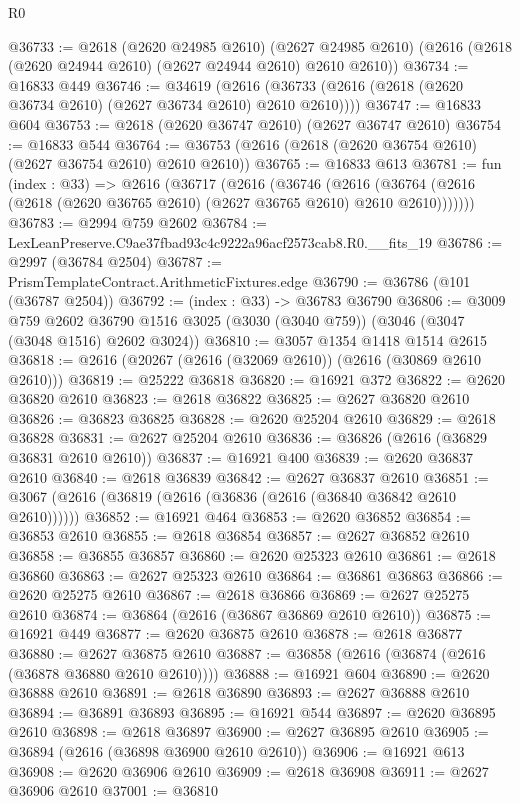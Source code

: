 \begin{lexlean}{R0}
\begin{coremodule}
@36733 := @2618
    (@2620 @24985 @2610)
    (@2627 @24985 @2610)
    (@2616 (@2618 (@2620 @24944 @2610) (@2627 @24944 @2610) @2610 @2610))
@36734 := @16833 @449
@36746 := @34619
    (@2616 (@36733 (@2616 (@2618 (@2620 @36734 @2610) (@2627 @36734 @2610) @2610 @2610))))
@36747 := @16833 @604
@36753 := @2618 (@2620 @36747 @2610) (@2627 @36747 @2610)
@36754 := @16833 @544
@36764 := @36753 (@2616 (@2618 (@2620 @36754 @2610) (@2627 @36754 @2610) @2610 @2610))
@36765 := @16833 @613
@36781 := fun (index : @33) =>
  @2616
    (@36717
      (@2616
        (@36746
          (@2616 (@36764 (@2616 (@2618 (@2620 @36765 @2610) (@2627 @36765 @2610) @2610 @2610)))))))
@36783 := @2994 @759 @2602
@36784 := LexLeanPreserve.C9ae37fbad93c4c9222a96acf2573cab8.R0.__fits_19
@36786 := @2997 (@36784 @2504)
@36787 := PrismTemplateContract.ArithmeticFixtures.edge
@36790 := @36786 (@101 (@36787 @2504))
@36792 := (index : @33) -> @36783 @36790
@36806 := @3009
    @759
    @2602
    @36790
    @1516
    @3025
    (@3030 (@3040 @759))
    (@3046 (@3047 (@3048 @1516) @2602 @3024))
@36810 := @3057 @1354 @1418 @1514 @2615
@36818 := @2616 (@20267 (@2616 (@32069 @2610)) (@2616 (@30869 @2610 @2610)))
@36819 := @25222 @36818
@36820 := @16921 @372
@36822 := @2620 @36820 @2610
@36823 := @2618 @36822
@36825 := @2627 @36820 @2610
@36826 := @36823 @36825
@36828 := @2620 @25204 @2610
@36829 := @2618 @36828
@36831 := @2627 @25204 @2610
@36836 := @36826 (@2616 (@36829 @36831 @2610 @2610))
@36837 := @16921 @400
@36839 := @2620 @36837 @2610
@36840 := @2618 @36839
@36842 := @2627 @36837 @2610
@36851 := @3067 (@2616 (@36819 (@2616 (@36836 (@2616 (@36840 @36842 @2610 @2610))))))
@36852 := @16921 @464
@36853 := @2620 @36852
@36854 := @36853 @2610
@36855 := @2618 @36854
@36857 := @2627 @36852 @2610
@36858 := @36855 @36857
@36860 := @2620 @25323 @2610
@36861 := @2618 @36860
@36863 := @2627 @25323 @2610
@36864 := @36861 @36863
@36866 := @2620 @25275 @2610
@36867 := @2618 @36866
@36869 := @2627 @25275 @2610
@36874 := @36864 (@2616 (@36867 @36869 @2610 @2610))
@36875 := @16921 @449
@36877 := @2620 @36875 @2610
@36878 := @2618 @36877
@36880 := @2627 @36875 @2610
@36887 := @36858 (@2616 (@36874 (@2616 (@36878 @36880 @2610 @2610))))
@36888 := @16921 @604
@36890 := @2620 @36888 @2610
@36891 := @2618 @36890
@36893 := @2627 @36888 @2610
@36894 := @36891 @36893
@36895 := @16921 @544
@36897 := @2620 @36895 @2610
@36898 := @2618 @36897
@36900 := @2627 @36895 @2610
@36905 := @36894 (@2616 (@36898 @36900 @2610 @2610))
@36906 := @16921 @613
@36908 := @2620 @36906 @2610
@36909 := @2618 @36908
@36911 := @2627 @36906 @2610
@37001 := @36810

\end{coremodule}
\end{lexlean}
